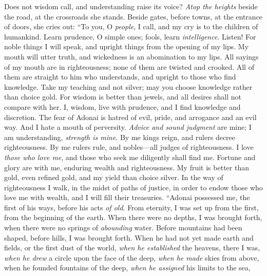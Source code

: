 \begin{biblechapter} %
 Does not wisdom call, 
and understanding raise its voice?
\verse \textit{Atop the heights} beside the road, 
at the crossroads she stands.
\verse Beside gates, before towns, 
at the entrance of doors, she cries out:
\verse “To you, O \textit{people}, I call, 
and my cry is to the children of humankind.
\verse Learn prudence, O simple ones; 
fools, learn \textit{intelligence}.
\verse Listen! For noble things I will speak, 
and upright things from the opening of my lips.
\verse My mouth will utter truth, 
and wickedness is an abomination to my lips.
\verse All sayings of my mouth are in righteousness; 
none of them are twisted and crooked.
\verse All of them are straight to him who understands, 
and upright to those who find knowledge.
\verse Take my teaching and not silver; 
may you choose knowledge rather than choice gold.
\verse For wisdom is better than jewels, 
and all desires shall not compare with her.
\verse I, wisdom, live with prudence, 
and I find knowledge and discretion.
\verse The fear of Adonai is hatred of evil, 
pride, and arrogance and an evil way. 
And I hate a mouth of perversity.
\verse \textit{Advice and sound judgment} are mine; 
I am understanding, \textit{strength is mine}.
\verse By me kings reign, 
and rulers decree righteousness.
\verse By me rulers rule, 
and nobles—all judges of righteousness.
\verse I love \textit{those who love me}, 
and those who seek me diligently shall find me.
\verse Fortune and glory are with me, 
enduring wealth and righteousness.
\verse My fruit is better than gold, even refined gold, 
and my yield than choice silver.
\verse In the way of righteousness I walk, 
in the midst of paths of justice,
\verse in order to endow those who love me with wealth, 
and I will fill their treasuries.
 “Adonai possessed me, the first of his ways, 
before his acts \textit{of old}.
\verse From eternity, I was set up from the first, 
from the beginning of the earth.
\verse When there were no depths, I was brought forth, 
when there were no springs of \textit{abounding} water.
\verse Before mountains had been shaped, 
before hills, I was brought forth.
\verse When he had not yet made earth and fields, 
or the first dust of the world,
\verse \textit{when he established} the heavens, there I was, 
\textit{when he drew} a circle upon the face of the deep,
\verse \textit{when he made} skies from above, 
when he founded fountains of the deep,
\verse \textit{when he assigned} his limits to the sea, 

\end{biblechapter}
